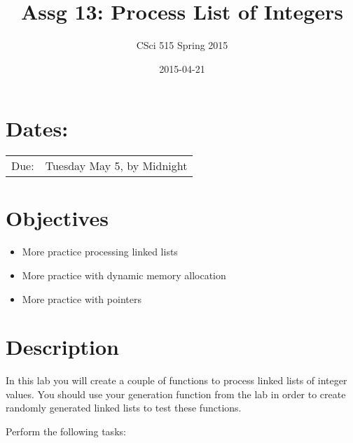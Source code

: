 \documentclass[11pt]{article}
\title{Assg 13: Process List of Integers}
\author{CSci 515 Spring 2015}
\date{2015-04-21}
\begin{document}
\maketitle


\section*{Dates:}
\label{sec-1}


\begin{center}
\begin{tabular}{ll}
 Due:  &  Tuesday May 5, by Midnight  \\
\end{tabular}
\end{center}
\section*{Objectives}
\label{sec-2}

\begin{itemize}
\item More practice processing linked lists
\item More practice with dynamic memory allocation
\item More practice with pointers
\end{itemize}
\section*{Description}
\label{sec-3}

In this lab you will create a couple of functions to process linked lists
of integer values.  You should use your generation function from the lab
in order to create randomly generated linked lists to test these functions.

Perform the following tasks:
\end{document}
